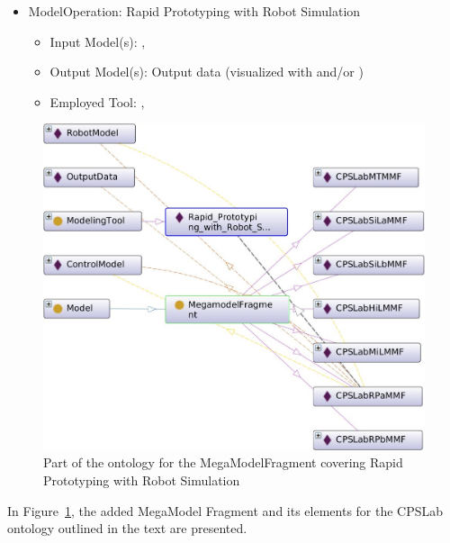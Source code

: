 
\begin{itemize}
    \item ModelOperation: Rapid Prototyping with Robot Simulation
    \begin{itemize}
        \item Input Model(s): \CPSLabControlModel, \CPSLabRobotModel
        \item Output Model(s): Output data (visualized with \MATLABSimulinkSimulator and/or \FESTORobotinoView)
        \item Employed Tool: \MATLABSimulinkSimulator, \FESTORobotinoSim %
    \end{itemize}
\end{itemize}


\begin{figure}[!htb]
\centering
\includegraphics[scale=0.333]{figures/CPSLabRPaMMF.jpg}
\caption{Part of the ontology for the MegaModelFragment \CPSLabRPaMMF covering Rapid Prototyping with Robot Simulation}
\label{fig:CPSLabRPaMMF}
\end{figure}


In Figure~\ref{fig:CPSLabRPaMMF}, the added MegaModel Fragment \CPSLabRPaMMF and its elements for the CPSLab ontology outlined in the text are presented.

 

